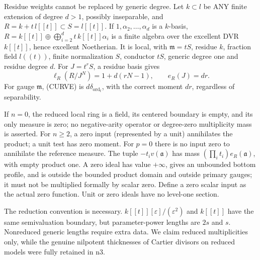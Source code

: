 Residue weights cannot be replaced by generic degree. Let \(k\subset l\) be ANY finite extension of degree \(d>1\), possibly inseparable, and \(R=k+t\,l[[t]]\subset S=l[[t]]\). If \(1,\alpha_2,\ldots,\alpha_d\) is a \(k\)-basis, \(R=k[[t]]\oplus\bigoplus_{i=2}^d t\,k[[t]]\alpha_i\) is a finite algebra over the excellent DVR \(k[[t]]\), hence excellent Noetherian. It is local, with \(\mathfrak m=tS\), residue \(k\), fraction field \(l((t))\), finite normalization \(S\), conductor \(tS\), generic degree one and residue degree \(d\). For \(J=t^rS\), a residue basis gives
\[
\ell_R(R/J^N)=1+d(rN-1),\qquad e_R(J)=dr.
\]
For gauge \(\mathfrak m\), (CURVE) is \(d\delta_{\operatorname{ord}_t}\), with the correct moment \(dr\), regardless of separability.

If \(n=0\), the reduced local ring is a field, its centered boundary is empty, and its only measure is zero; no negative-arity operator or degree-zero multiplicity mass is asserted. For \(n\ge2\), a zero input (represented by a unit) annihilates the product; a unit test has zero moment. For \(p=0\) there is no input zero to annihilate the reference measure. The tuple \(-t_i v(\mathfrak a)\) has mass \((\prod_i t_i)e_R(\mathfrak a)\), with empty product one. A zero ideal has value \(+\infty\), gives an unbounded bottom profile, and is outside the bounded product domain and outside primary gauges; it must not be multiplied formally by scalar zero. Define a zero scalar input as the actual zero function. Unit or zero ideals have no level-one section.

The reduction convention is necessary. \(k[[t]][\varepsilon]/(\varepsilon^2)\) and \(k[[t]]\) have the same semivaluation boundary, but parameter-power lengths are \(2s\) and \(s\). Nonreduced generic lengths require extra data. We claim reduced multiplicities only, while the genuine nilpotent thicknesses of Cartier divisors on reduced models were fully retained in n3.
